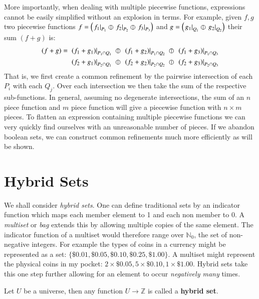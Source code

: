 More importantly, when dealing with multiple piecewise functions, expressions cannot be easily simplified without an explosion in terms.
For example, given $f,g$ two piecewise functions 
$f = \left(\left.f_1\right|_{P_1} \varobar \left.f_2\right|_{P_2} \varobar \left.f_3\right|_{P_3} \right)$ 
and $g= \left( \left.g_1\right|_{Q_1} \varobar \left.g_2\right|_{Q_2} \right)$ their sum $(f+g)$ is:
\begin{align}
	(f+g) = \;
	&\left.(f_1+g_1)\right|_{P_1 \cap Q_1} 
		\;\varobar\; \left.(f_1+g_2)\right|_{P_1 \cap Q_2} 
		\;\varobar\; \left.(f_1+g_3)\right|_{P_1 \cap Q_3}\notag\\
	&\left.(f_2+g_1)\right|_{P_2 \cap Q_1} 
	 	\;\varobar\; \left.(f_2+g_2)\right|_{P_2 \cap Q_2} 
	 	\;\varobar\; \left.(f_2+g_3)\right|_{P_2 \cap Q_3}
\end{align}
That is, we first create a common refinement by the pairwise intersection of each $P_i$ with each $Q_j$.
Over each intersection we then take the sum of the respective sub-functions.
In general, assuming no degenerate intersections, the sum of an $n$ piece function and $m$ piece function will give a piecewise function with $n\times m$ pieces.
To flatten an expression containing multiple piecewise functions we can very quickly find ourselves with an unreasonable number of pieces.
If we abandon boolean sets, we can construct common refinements much more efficiently as will be shown.





%
%
\section{Hybrid Sets}


We shall consider \emph{hybrid sets}.
One can define traditional sets by an indicator function which maps each member element to 1 and each non member to 0.
A \emph{multiset} or \emph{bag} extends this by allowing multiple copies of the same element.
The indicator function of a multiset would therefore range over $\mathbb{N}_0$, the set of non-negative integers.
For example the types of coins in a currency might be represented as a set: $\{ \$0.01, \$0.05, \$0.10, \$0.25, \$1.00 \}$.
A multiset might represent the physical coins in my pocket: $2 \times \$0.05, 5 \times \$0.10, 1 \times \$1.00$.
Hybrid sets take this one step further allowing for an element to occur \emph{negatively many} times.


\begin{definition}
	Let $U$ be a universe, then any function $U \to \mathbb{Z}$ is called a \textbf{hybrid set}.
\end{definition}


